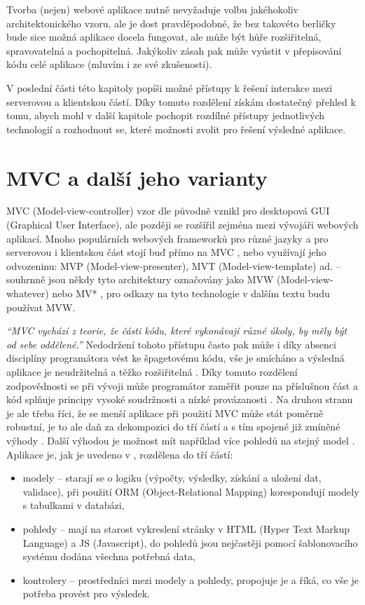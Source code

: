 Tvorba (nejen) webové aplikace nutně nevyžaduje volbu jakéhokoliv architektonického vzoru, ale je dost pravděpodobné, že bez takovéto berličky bude sice možná aplikace docela fungovat, ale může být hůře rozšiřitelná, spravovatelná a pochopitelná. Jakýkoliv zásah pak může vyústit v přepisování kódu celé aplikace (mluvím i ze své zkušenosti).

V poslední části této kapitoly popíši možné přístupy k řešení interakce mezi serverovou a klientskou částí. Díky tomuto rozdělení získám dostatečný přehled k tomu, abych mohl v další kapitole pochopit rozdílné přístupy jednotlivých technologií a rozhodnout se, které možnosti zvolit pro řešení výsledné aplikace.

    \section{MVC a další jeho varianty}\label{mvc}
    MVC (Model-view-controller) vzor dle \cite{mvc-cz1} původně vznikl pro desktopová GUI (Graphical User Interface), ale později se rozšířil zejména mezi vývojáři webových aplikací. Mnoho populárních webových frameworků pro různé jazyky a pro serverovou i klientskou část stojí buď přímo na MVC \cite{mvc-cz1}, nebo využívají jeho odvozeninu: MVP (Model-view-presenter), MVT (Model-view-template) ad. -- souhrnně jsou někdy tyto architektury označovány jako MVW (Model-view-whatever) nebo MV* \cite{mvw}, pro odkazy na tyto technologie v dalším textu budu používat MVW.
    
    \textit{\enquote{MVC vychází z teorie, že části kódu, které vykonávají různé úkoly, by měly být od sebe oddělené.}} \cite{mvc-cz2} Nedodržení tohoto přístupu často pak může i díky absenci disciplíny programátora vést ke špagetovému kódu, vše je smícháno a výsledná aplikace je neudržitelná a těžko rozšiřitelná \cite{mvc-cz2,mvc-2}. Díky tomuto rozdělení zodpovědnosti se při vývoji může programátor zaměřit pouze na příslušnou část a kód splňuje principy vysoké soudržnosti a nízké provázanosti \cite{mvc-medium1}. Na druhou stranu je ale třeba říci, že se menší aplikace při použití MVC může stát poměrně robustní, je to ale daň za dekompozici do tří částí a s tím spojené již zmíněné výhody \cite{mvc-medium1}. Další výhodou je možnost mít například více pohledů na stejný model \cite{mvc-1}. Aplikace je, jak je uvedeno v \cite{mvc-cz2}, rozdělena do tří částí:
    \begin{itemize}
        \item modely -- starají se o logiku (výpočty, výsledky, získání a uložení dat, validace), při použití ORM (Object-Relational Mapping) korespondují modely s tabulkami v databázi,
        \item pohledy -- mají na starost vykreslení stránky v HTML (Hyper Text Markup Language) a JS (Javascript), do pohledů jsou nejčastěji pomocí šablonovacího systému dodána všechna potřebná data,
        \item kontrolery -- prostředníci mezi modely a pohledy, propojuje je a říká, co vše je potřeba provést pro výsledek.
    \end{itemize}
    
